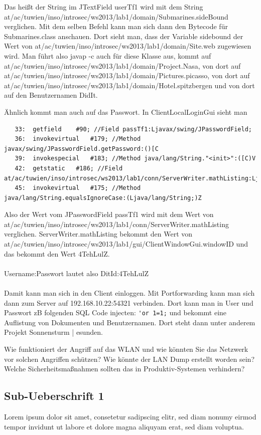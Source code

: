 \documentclass[12pt,a4paper,titlepage,oneside]{scrartcl}
\begin{document}
Das heißt der String im JTextField userTf1 wird mit dem String at/ac/tuwien/inso/introsec/ws2013/lab1/domain/Submarines.sideBound verglichen. Mit dem selben Befehl kann man sich dann den Bytecode für Submarines.class anschauen. Dort sieht man, dass der Variable sidebound der Wert von at/ac/tuwien/inso/introsec/ws2013/lab1/domain/Site.web zugewiesen wird. Man führt also javap -c auch für diese Klasse aus, kommt auf at/ac/tuwien/inso/introsec/ws2013/lab1/domain/Project.Nasa, von dort auf at/ac/tuwien/inso/introsec/ws2013/lab1/domain/Pictures.picasso, von dort auf at/ac/tuwien/inso/introsec/ws2013/lab1/domain/Hotel.spitzbergen und von dort auf den Benutzernamen DidIt.

Ähnlich kommt man auch auf das Passwort. In ClientLocalLoginGui sieht man
\begin{lstlisting}
   33:  getfield    #90; //Field passTf1:Ljavax/swing/JPasswordField;
   36:  invokevirtual   #179; //Method javax/swing/JPasswordField.getPassword:()[C
   39:  invokespecial   #183; //Method java/lang/String."<init>":([C)V
   42:  getstatic   #186; //Field at/ac/tuwien/inso/introsec/ws2013/lab1/conn/ServerWriter.mathListing:Ljava/lang/String;
   45:  invokevirtual   #175; //Method java/lang/String.equalsIgnoreCase:(Ljava/lang/String;)Z
\end{lstlisting}

Also der Wert vom JPasswordField passTf1 wird mit dem Wert von at/ac/tuwien/inso/introsec/ws2013/lab1/conn/ServerWriter.mathListing verglichen. ServerWriter.mathListing bekommt den Wert von at/ac/tuwien/inso/introsec/ws2013/lab1/gui/ClientWindowGui.windowID und das bekommt den Wert 4TehLulZ.
\\\\
Username:Passwort lautet also DitId:4TehLulZ
\\\\
Damit kann man sich in den Client einloggen. Mit Portforwarding kann man sich dann zum Server auf 192.168.10.22:54321 verbinden. Dort kann man in User und Passwort zB folgenden SQL Code injecten: \lstinline{'or 1=1;} und bekommt eine Auflistung von Dokumenten und Benutzernamen. Dort steht dann unter anderem Projekt Sonnensturm | esunden.



Wie funktioniert der Angriff auf das WLAN und wie könnten Sie das Netzwerk vor solchen Angriffen schützen?
Wie könnte der LAN Dump erstellt worden sein? Welche Sicherheitsmaßnahmen sollten das in Produktiv-Systemen verhindern?

\subsection{Sub-Ueberschrift 1}
Lorem ipsum dolor sit amet, consetetur sadipscing elitr, sed diam nonumy eirmod tempor invidunt ut labore et dolore magna aliquyam erat, sed diam voluptua. 
\end{document}
